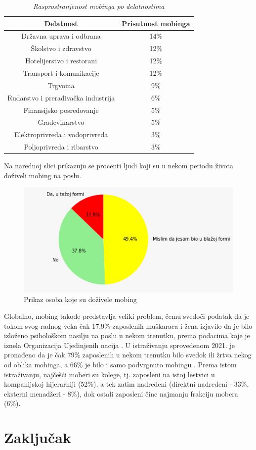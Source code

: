 \documentclass[a4paper]{article}
\begin{document}
    \begin{table}[h]
        \centering
        \caption{\label{tab1}\textit{Rasprostranjenost mobinga po delatnostima}}
        \begin{tabular}{c|c}
             Delatnost & Prisutnost mobinga \\ \hline
             Državna uprava i odbrana & 14\% \\
             Školstvo i zdravstvo & 12\% \\
             Hotelijerstvo i restorani & 12\% \\
             Transport i komunikacije & 12\% \\
             Trgvoina & 9\% \\
             Rudarstvo i prerađivačka industrija & 6\% \\
             Finansijsko posredovanje & 5\% \\
             Građevinarstvo & 5\% \\
             Elektroprivreda i vodoprivreda & 3\% \\
             Poljoprivreda i ribarstvo & 3\%
        \end{tabular}
    \end{table}
    
    Na narednoj slici prikazuju se procenti ljudi koji su u nekom periodu života doživeli mobing na poslu.
    
    \begin{figure}[h]
    \centering
    \includegraphics{mobing.jpeg}
    \caption{Prikaz osoba koje su doživele mobing}
    \end{figure}
    
    Globalno, mobing takođe predstavlja veliki problem, čemu svedoči podatak da je tokom svog radnog veka čak 17,9\% zaposlenih muškaraca i žena izjavilo da je bilo izloženo psihološkom nasilju na poslu u nekom trenutku, prema podacima koje je iznela Organizacija Ujedinjenih nacija \cite{unreport}. U istraživanju sprovedenom 2021. je pronađeno da je čak 79\% zaposlenih u nekom trenutku bilo svedok ili žrtva nekog od oblika mobinga, a 66\% je bilo i samo podvrgnuto mobingu \cite{wpeareport}. Prema istom istraživanju, najčešći moberi su kolege, tj. zaposleni na istoj lestvici u kompanijskoj hijerarhiji (52\%), a tek zatim nadređeni (direktni nadređeni - 33\%, eksterni menadžeri - 8\%), dok ostali zaposleni čine najmanju frakciju mobera (6\%).
    
    
    \section{Zaključak}
    
    \printglossary[type=\acronymtype]
    
    \appendix
    
    
\end{document}
